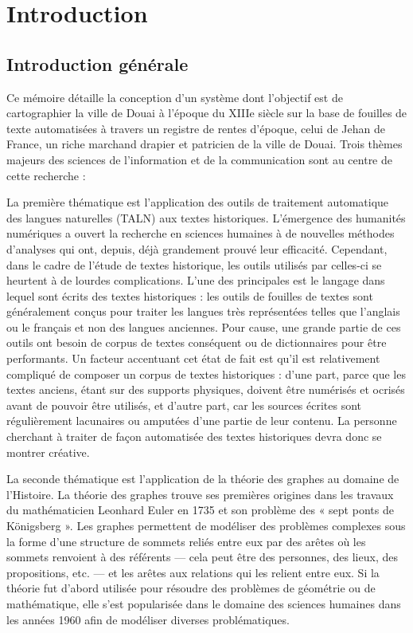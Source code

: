 \chapter{Introduction}
\section{Introduction générale}
 Ce mémoire détaille la conception d’un système dont l’objectif est de cartographier la ville de Douai à l’époque du XIIIe siècle sur la base de fouilles de texte automatisées à travers un registre de rentes d'époque, celui de Jehan de France, un riche marchand drapier et patricien de la ville de Douai. Trois thèmes majeurs des sciences de l'information et de la communication sont au centre de cette recherche :
 
 La première thématique est l’application des outils de traitement automatique des langues naturelles (TALN) aux textes historiques. L’émergence des humanités numériques a ouvert la recherche en sciences humaines à de nouvelles méthodes d’analyses qui ont, depuis, déjà grandement prouvé leur efficacité. Cependant, dans le cadre de l’étude de textes historique, les outils utilisés par celles-ci se heurtent à de lourdes complications. L’une des principales est le langage dans lequel sont écrits des textes historiques : les outils de fouilles de textes sont généralement conçus pour traiter les langues très représentées telles que l’anglais ou le français et non des langues anciennes. Pour cause, une grande partie de ces outils ont besoin de corpus de textes conséquent ou de dictionnaires pour être performants. Un facteur accentuant cet état de fait est qu’il est relativement compliqué de composer un corpus de textes historiques : d’une part, parce que les textes anciens, étant sur des supports physiques, doivent être numérisés et ocrisés avant de pouvoir être utilisés, et d’autre part, car les sources écrites sont régulièrement lacunaires ou amputées d’une partie de leur contenu. La personne cherchant à traiter de façon automatisée des textes historiques devra donc se montrer créative.
 
La seconde thématique est l’application de la théorie des graphes au domaine de l’Histoire. La théorie des graphes trouve ses premières origines dans les travaux du mathématicien Leonhard Euler en 1735 et son problème des « sept ponts de Königsberg »\parencite{euler_solutio_1735}. Les graphes permettent de modéliser des problèmes complexes sous la forme d’une structure de sommets reliés entre eux par des arêtes où les sommets renvoient à des référents — cela peut être des personnes, des lieux, des propositions, etc. — et les arêtes aux relations qui les relient entre eux. Si la théorie fut d’abord utilisée pour résoudre des problèmes de géométrie ou de mathématique, elle s’est popularisée dans le domaine des sciences humaines dans les années 1960 afin de modéliser diverses problématiques.

